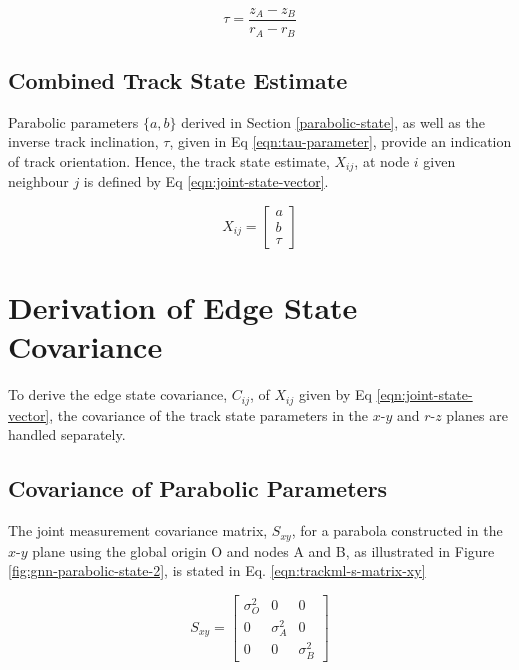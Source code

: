 \begin{equation}
\tau = \frac{z_A - z_B}{r_A - r_B}
\label{eqn:tau-parameter}
\end{equation}

\subsection{Combined Track State Estimate}

Parabolic parameters $\{a, b\}$ derived in Section \ref{parabolic-state}, as well as the inverse track inclination, $\tau$, given in Eq \eqref{eqn:tau-parameter}, provide an indication of track orientation. Hence, the track state estimate, $X_{ij}$, at node $i$ given neighbour $j$ is defined by Eq \eqref{eqn:joint-state-vector}.

\begin{equation}
X_{ij} = \begin{bmatrix} a \\ b \\ \tau \end{bmatrix}
\label{eqn:joint-state-vector}
\end{equation}







\section{Derivation of Edge State Covariance}
\label{chapter-6-covariance-derivation}

To derive the edge state covariance, $C_{ij}$, of $X_{ij}$ given by Eq \eqref{eqn:joint-state-vector}, the covariance of the track state parameters in the $x$-$y$ and $r$-$z$ planes are handled separately. 


\subsection{Covariance of Parabolic Parameters}

The joint measurement covariance matrix, $S_{xy}$, for a parabola constructed in the $x$-$y$ plane using the global origin O and nodes A and B, as illustrated in Figure \ref{fig:gnn-parabolic-state-2}, is stated in Eq. \eqref{eqn:trackml-s-matrix-xy}


\begin{equation}
    S_{xy} = \begin{bmatrix} \sigma_O^{2} & 0 & 0 \\ 0 & \sigma_A^{2} & 0 \\ 0 & 0 & \sigma_B^{2} \end{bmatrix} 
    \label{eqn:trackml-s-matrix-xy}
\end{equation}


